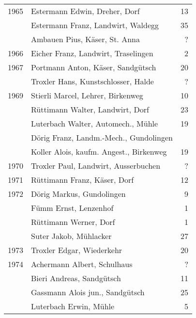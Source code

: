 {\begin{longtable}{ l l r }
        1965          & Estermann Edwin, Dreher, Dorf             & 13          \\
                      & Estermann Franz, Landwirt, Waldegg        & 35          \\
                      & Ambauen Pius, Käser, St. Anna             & ?           \\
        1966          & Eicher Franz, Landwirt, Traselingen       & 2           \\
        1967          & Portmann Anton, Käser, Sandgütsch         & 20          \\
                      & Troxler Hans, Kunstschlosser, Halde       & ?           \\
        1969          & Stierli Marcel, Lehrer, Birkenweg         & 10          \\
                      & Rüttimann Walter, Landwirt, Dorf          & 23          \\
                      & Luterbach Walter, Automech., Mühle        & 19          \\
                      & Dörig Franz, Landm.-Mech., Gundolingen    &             \\
                      & Koller Alois, kaufm. Angest., Birkenweg   & 19          \\
        1970          & Troxler Paul, Landwirt, Ausserbuchen      & ?           \\
        1971          & Rüttimann Franz, Käser, Dorf              & 12          \\
        1972          & Dörig Markus, Gundolingen                 & 9           \\
                      & Fümm Ernst, Lenzenhof                     & 1           \\
                      & Rüttimann Werner, Dorf                    & 1           \\
                      & Suter Jakob, Mühlacker                    & 27          \\
        1973          & Troxler Edgar, Wiederkehr                 & 20          \\
        1974          & Achermann Albert, Schulhaus               & ?           \\
                      & Bieri Andreas, Sandgütsch                 & 11          \\
                      & Gassmann Alois jun., Sandgütsch           & 25          \\
                      & Luterbach Erwin, Mühle                    & 5           \\

\end{longtable}}

